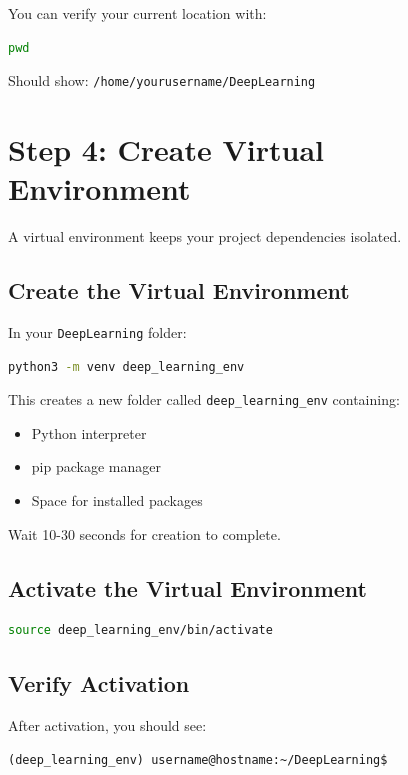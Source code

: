 \documentclass[11pt,a4paper]{article}
\begin{document}
\begin{tipbox}
You can verify your current location with:
\begin{lstlisting}[language=bash]
pwd
\end{lstlisting}
Should show: \texttt{/home/yourusername/DeepLearning}
\end{tipbox}

\section{Step 4: Create Virtual Environment}

A virtual environment keeps your project dependencies isolated.

\subsection{Create the Virtual Environment}

In your \texttt{DeepLearning} folder:
\begin{lstlisting}[language=bash]
python3 -m venv deep_learning_env
\end{lstlisting}

This creates a new folder called \texttt{deep\_learning\_env} containing:
\begin{itemize}
    \item Python interpreter
    \item pip package manager
    \item Space for installed packages
\end{itemize}

Wait 10-30 seconds for creation to complete.

\subsection{Activate the Virtual Environment}

\begin{lstlisting}[language=bash]
source deep_learning_env/bin/activate
\end{lstlisting}

\subsection{Verify Activation}

After activation, you should see:
\begin{lstlisting}
(deep_learning_env) username@hostname:~/DeepLearning$
\end{lstlisting}
\end{document}
